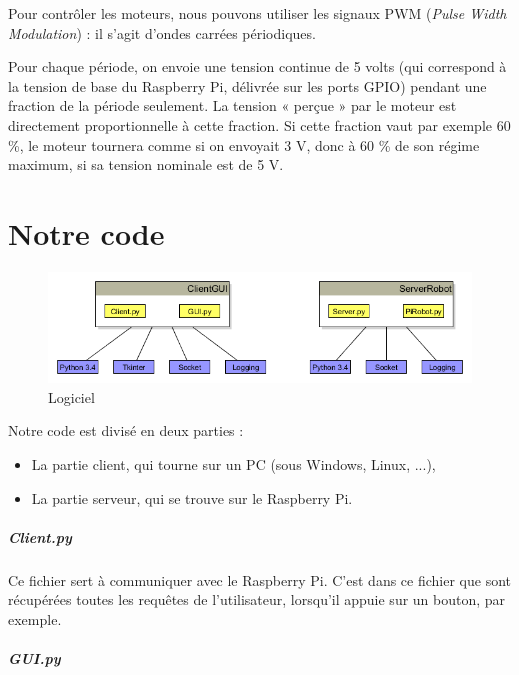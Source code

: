 \documentclass[12pt,a4paper]{report}
\begin{document}
Pour contrôler les moteurs, nous pouvons utiliser les signaux PWM (\textit{Pulse Width Modulation}) : il s'agit d'ondes carrées périodiques. 

Pour chaque période, on envoie une tension continue de 5 volts (qui correspond à la tension de base du Raspberry Pi, délivrée sur les ports GPIO) pendant une fraction de la période seulement. La tension « perçue » par le moteur est directement proportionnelle à cette fraction. Si cette fraction vaut par exemple 60 \%, le moteur tournera comme si on envoyait 3 V, donc à 60 \% de son régime maximum, si sa tension nominale est de 5 V. 

\chapter{Notre code}

\begin{figure}[hf!]
\center
\includegraphics[scale=0.6]{GraphLogiciel.png}
\caption{Logiciel}
\end{figure}

Notre code est divisé en deux parties :

\bigbreak

\begin{itemize}
\item La partie client, qui tourne sur un PC (sous Windows, Linux, ...),
\item La partie serveur, qui se trouve sur le Raspberry Pi.
\end{itemize}

\bigbreak

\paragraph{Client.py}

Ce fichier sert à communiquer avec le Raspberry Pi. C'est dans ce fichier que sont récupérées toutes les requêtes de l'utilisateur, lorsqu'il appuie sur un bouton, par exemple.

\paragraph{GUI.py}
\end{document}
